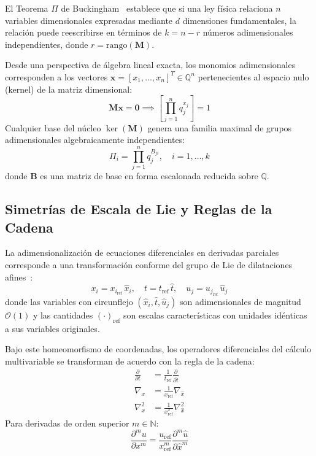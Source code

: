 \documentclass[11pt,a4paper]{article}
\theoremstyle{definition}
\theoremstyle{plain}
\theoremstyle{remark}
\newcommand{\dimless}[1]{\hat{#1}}
\newcommand{\refscale}[1]{#1_{\mathrm{ref}}}
\begin{document}
El Teorema $\Pi$ de Buckingham~\cite{buckingham1914} establece que si una ley física relaciona $n$ variables dimensionales expresadas mediante $d$ dimensiones fundamentales, la relación puede reescribirse en términos de $k = n - r$ números adimensionales independientes, donde $r = \mathrm{rango}(\mathbf{M})$.

Desde una perspectiva de álgebra lineal exacta, los monomios adimensionales corresponden a los vectores $\mathbf{x} = [x_1, \dots, x_n]^T \in \mathbb{Q}^n$ pertenecientes al espacio nulo (kernel) de la matriz dimensional:
\begin{equation}
    \mathbf{M} \mathbf{x} = \mathbf{0} \implies \left[ \prod_{j=1}^n q_j^{x_j} \right] = 1
\end{equation}
Cualquier base del núcleo $\ker(\mathbf{M})$ genera una familia maximal de grupos adimensionales algebraicamente independientes:
\begin{equation}
    \Pi_i = \prod_{j=1}^n q_j^{B_{ji}}, \quad i = 1, \dots, k
\end{equation}
donde $\mathbf{B}$ es una matriz de base en forma escalonada reducida sobre $\mathbb{Q}$.

\subsection{Simetrías de Escala de Lie y Reglas de la Cadena}

La adimensionalización de ecuaciones diferenciales en derivadas parciales corresponde a una transformación conforme del grupo de Lie de dilataciones afines~\cite{olver1993}:
\begin{equation}
    x_i = \refscale{x_i} \, \dimless{x}_i, \quad t = \refscale{t} \, \dimless{t}, \quad u_j = \refscale{u_j} \, \dimless{u}_j
\end{equation}
donde las variables con circunflejo $(\dimless{x}_i, \dimless{t}, \dimless{u}_j)$ son adimensionales de magnitud $\mathcal{O}(1)$ y las cantidades $\refscale{(\cdot)}$ son escalas características con unidades idénticas a sus variables originales.

Bajo este homeomorfismo de coordenadas, los operadores diferenciales del cálculo multivariable se transforman de acuerdo con la regla de la cadena:
\begin{align}
    \frac{\partial}{\partial t} &= \frac{1}{\refscale{t}} \frac{\partial}{\partial \dimless{t}} \\
    \nabla_x &= \frac{1}{\refscale{x}} \nabla_{\dimless{x}} \\
    \nabla_x^2 &= \frac{1}{\refscale{x}^2} \nabla_{\dimless{x}}^2
\end{align}
Para derivadas de orden superior $m \in \mathbb{N}$:
\begin{equation}
    \frac{\partial^m u}{\partial x^m} = \frac{\refscale{u}}{\refscale{x}^m} \frac{\partial^m \dimless{u}}{\partial \dimless{x}^m}
\end{equation}
\end{document}
